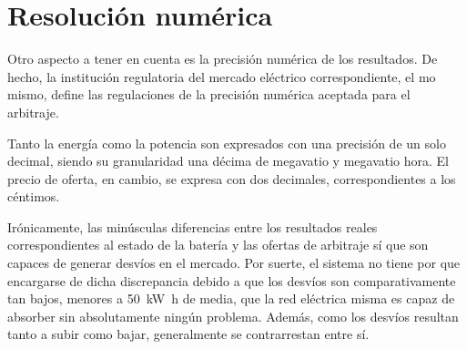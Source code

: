 \section{Resolución numérica}%
\label{makereference5.4}

Otro aspecto a tener en cuenta es la precisión numérica de los resultados. De hecho, la institución regulatoria del mercado eléctrico correspondiente, el \gls{mo} mismo, define las regulaciones de la precisión numérica aceptada para el arbitraje.

Tanto la energía como la potencia son expresados con una precisión de un solo decimal, siendo su granularidad una décima de megavatio y megavatio hora. El precio de oferta, en cambio, se expresa con dos decimales, correspondientes a los céntimos.

Irónicamente, las minúsculas diferencias entre los resultados reales correspondientes al estado de la batería y las ofertas de arbitraje sí que son capaces de generar desvíos en el mercado. Por suerte, el sistema no tiene por que encargarse de dicha discrepancia debido a que los desvíos son comparativamente tan bajos, menores a \SI{50}{{\kilo\watt\hour}} de media, que la red eléctrica misma es capaz de absorber sin absolutamente ningún problema. Además, como los desvíos resultan tanto a subir como bajar, generalmente se contrarrestan entre sí.
